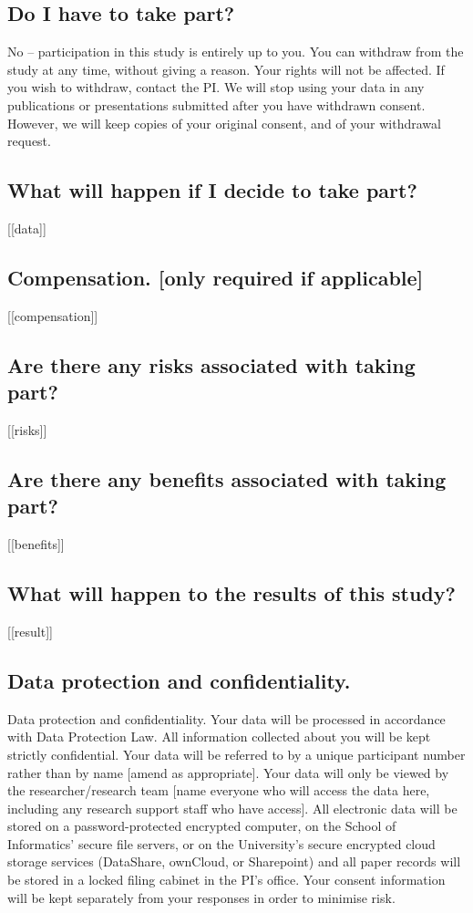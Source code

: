 \documentclass{article}
\begin{document}
\subsection*{Do I have to take part?}
No – participation in this study is entirely up to you. You can withdraw from the study at any time, without giving a reason. Your rights will not be affected. If you wish to withdraw, contact the PI. We will stop using your data in any publications or presentations submitted after you have withdrawn consent. However, we will keep copies of your original consent, and of your withdrawal request.
\subsection*{What will happen if I decide to take part? }
[[data]]
\subsection*{Compensation. [only required if applicable]}
[[compensation]]
\subsection*{Are there any risks associated with taking part?}
[[risks]]
\subsection*{Are there any benefits associated with taking part?}
[[benefits]]
\subsection*{What will happen to the results of this study? }
[[result]]
\subsection*{Data protection and confidentiality.}
Data protection and confidentiality.
Your data will be processed in accordance with Data Protection Law.  All information collected about you will be kept strictly confidential. Your data will be referred to by a unique participant number rather than by name [amend as appropriate]. Your data will only be viewed by the researcher/research team [name everyone who will access the data here, including any research support staff who have access].  
All electronic data will be stored on a password-protected encrypted computer, on the School of Informatics’ secure file servers, or on the University’s secure encrypted cloud storage services (DataShare, ownCloud, or Sharepoint) and all paper records will be stored in a locked filing cabinet in the PI’s office. Your consent information will be kept separately from your responses in order to minimise risk. 
\end{document}
